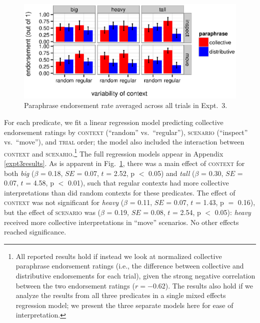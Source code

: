 \documentclass[preprint,12pt,authoryear,titlepage]{elsarticle}
\newcommand{\ndg}[1]{\textcolor{Green}{[ndg: #1]}}
\begin{document}

\begin{figure}[h!]
	\centering
	\includegraphics[width=\linewidth]{plots/expt3.eps} 
	\vspace{-20pt}
	\caption{Paraphrase endorsement rate averaged across all trials in Expt.~3.}\label{resultsexpt2}
\end{figure}

For each predicate, we fit a linear regression model predicting collective endorsement ratings by \textsc{context} (``random'' vs.~``regular''),
\textsc{scenario} (``inspect'' vs.~``move''), and \textsc{trial} order; the model also included the interaction between \textsc{context} and \textsc{scenario}.\footnote{All reported results hold if instead we look at normalized collective paraphrase endorsement ratings (i.e., the difference between collective and distributive endorsements for each trial), given the strong negative correlation between the two endorsement ratings ($r=-0.62$). The results also hold if we analyze the results from all three predicates in a single mixed effects regression model; we present the three separate models here for ease of interpretation.} The full regression models appear in Appendix \ref{expt3results}.
As is apparent in Fig.~\ref{resultsexpt2}, there was a main effect of \textsc{context} for both \emph{big} ($\beta$ = 0.18, $SE$ = 0.07, $t$ = 2.52, p $<$ 0.05) and \emph{tall} ($\beta$ = 0.30, $SE$ = 0.07, $t$ = 4.58, p $<$ 0.01), such that regular contexts had more collective interpretations than did random contexts for these predicates. The effect of \textsc{context} was not significant for \emph{heavy} ($\beta$ = 0.11, $SE$ = 0.07, $t$ = 1.43, p $=$ 0.16), but the effect of \textsc{scenario} was ($\beta$ = 0.19, $SE$ = 0.08, $t$ = 2.54, p $<$ 0.05): \emph{heavy} received more collective interpretations in ``move'' scenarios. No other effects reached significance.
\end{document}
